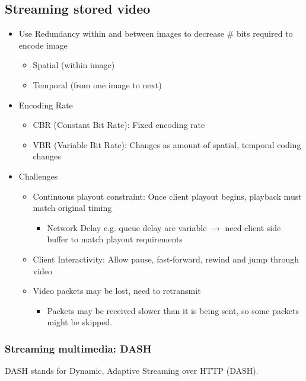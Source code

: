\documentclass[a4paper]{article}
\begin{document}
\subsection{Streaming stored video}
\begin{itemize}
    \item Use Redundancy within and between images to decrease \# bits required to encode image
    \begin{itemize}[label=$\circ$]
        \item Spatial (within image)
        \item Temporal (from one image to next)
    \end{itemize}
    \item Encoding Rate
    \begin{itemize}[label=$\circ$]
        \item CBR (Constant Bit Rate): Fixed encoding rate
        \item VBR (Variable Bit Rate): Changes as amount of spatial, temporal coding changes
    \end{itemize}
    \item Challenges
    \begin{itemize}[label=$\circ$]
        \item Continuous playout constraint: Once client playout begins, playback must match original timing
        \begin{itemize}[label=\tiny$\blacksquare$]
            \item Network Delay e.g. queue delay are variable $\rightarrow$ need client side buffer to match playout requirements
        \end{itemize}
        \item Client Interactivity: Allow pause, fast-forward, rewind and jump through video
        \item Video packets may be lost, need to retransmit    
        \begin{itemize}[label=\tiny$\blacksquare$]
            \item Packets may be received slower than it is being sent, so some packets might be skipped.
        \end{itemize}
    \end{itemize}
\end{itemize}

\newpage
\subsubsection{Streaming multimedia: DASH}
DASH stands for Dynamic, Adaptive Streaming over HTTP (DASH).
\end{document}
